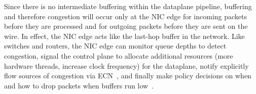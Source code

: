  Since there is no
intermediate buffering within the dataplane pipeline, buffering and
therefore congestion will occur only at the NIC edge for incoming
packets before they are processed and for outgoing packets before they
are sent on the wire.  In effect, the NIC edge acts like the last-hop
buffer in the network.  Like switches and routers, the NIC edge can
monitor queue depths to detect congestion, signal the control plane to
allocate additional resources (more hardware threads, increase clock
frequency) for the dataplane, notify explicitly flow sources of
congestion via ECN~\cite{ramakrishnan2001addition}, and finally make
policy decisions on when and how to drop packets when buffers run
low~\cite{DBLP:journals/ton/FloydJ93}.
